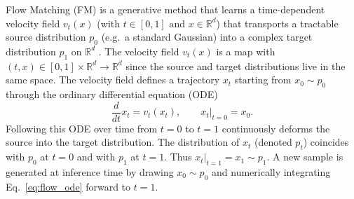 \documentclass{article}
\begin{document}
Flow Matching (FM) is a generative method that learns a time-dependent velocity field $v_t(x)$ (with $t \in [0,1]$ and $x \in \mathbb{R}^d$) that transports a tractable source distribution $p_0$ (e.g.\ a standard Gaussian) into a complex target distribution $p_1$ on $\mathbb{R}^d$ \citep{lipman2023flow}.
The velocity field $v_t(x)$ is a map with $(t, x) \in [0,1]\times\mathbb{R}^d \to \mathbb{R}^d$ since the source and target distributions live in the same space.
The velocity field defines a trajectory $x_t$ starting from $x_0 \sim p_0$ through the ordinary differential equation (ODE)
\begin{equation}
    \frac{d}{dt}x_t = v_t(x_t), \qquad x_t\big|_{t=0} = x_0.
    \label{eq:flow_ode}
\end{equation}
Following this ODE over time from $t=0$ to $t=1$ continuously deforms the source into the target distribution.
The distribution of $x_t$ (denoted $p_t$) coincides with $p_0$ at $t=0$ and with $p_1$ at $t=1$.
Thus $x_t\big|_{t=1} = x_1 \sim p_1$.
A new sample is generated at inference time by drawing $x_0 \sim p_0$ and numerically integrating Eq.~\eqref{eq:flow_ode} forward to $t=1$.
\end{document}

